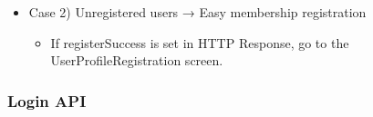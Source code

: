 \documentclass[conference]{IEEEtran}
\begin{document}
\begin{itemize}
\begin{itemize}
\begin{itemize}
\begin{itemize}
            \end{itemize}
        \end{itemize}
        \item Case 2) Unregistered users → Easy membership registration
        \begin{itemize}
            \item If registerSuccess is set in HTTP Response, go to the UserProfileRegistration screen.
            \\
        \end{itemize}
    \end{itemize}
\end{itemize}

\subsubsection{Login API}
\end{document}

